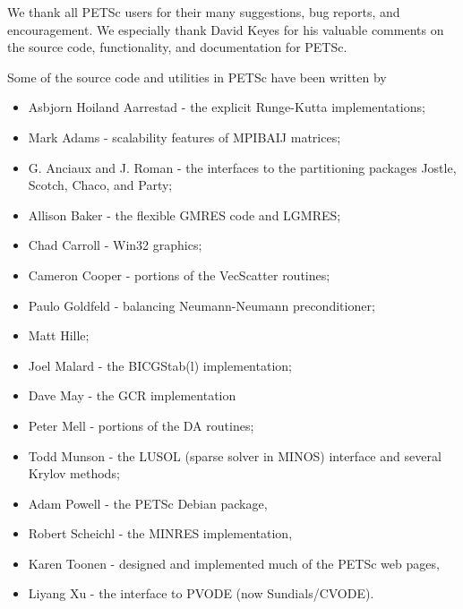 %
%

\medskip \medskip \noindent
We thank all PETSc users for their many suggestions, bug reports, and
encouragement.  We especially thank David Keyes
for his valuable comments on the source code,
functionality, and documentation for PETSc.


\vspace{.3in}
\noindent
Some of the source code and utilities in PETSc
have been written by 
\begin{itemize}
  \item Asbjorn Hoiland Aarrestad - the explicit Runge-Kutta implementations;
  \item Mark Adams - scalability features of MPIBAIJ matrices;
  \item G. Anciaux and J. Roman - the interfaces to the partitioning packages Jostle, Scotch, Chaco, and Party;
  \item Allison Baker - the flexible GMRES code and LGMRES;
  \item Chad Carroll - Win32 graphics;
  \item Cameron Cooper - portions of the VecScatter routines;
  \item Paulo Goldfeld - balancing Neumann-Neumann preconditioner;
  \item Matt Hille;
  \item Joel Malard - the BICGStab(l) implementation;
  \item Dave May - the GCR implementation
  \item Peter Mell - portions of the DA routines;
  \item Todd Munson - the LUSOL (sparse solver in MINOS) interface and several Krylov methods;
  \item Adam Powell - the PETSc Debian package, 
  \item Robert Scheichl - the MINRES implementation,
  \item Karen Toonen - designed and implemented much of the PETSc web pages,
  \item Liyang Xu - the interface to PVODE (now Sundials/CVODE).
\end{itemize}

